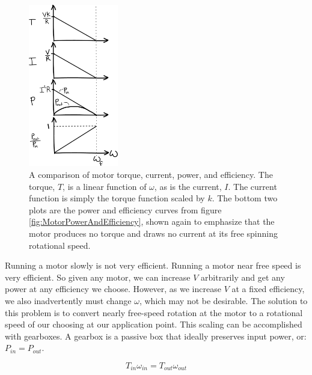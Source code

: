 \begin{figure}[h]		%
\begin{centering}
\includegraphics[width=0.35\textwidth]{Figures/FourMotorCurves}\par
\end{centering}
\caption[Plot: A Comparison of Four Motor Curves vs. $\omega$]{A comparison of motor torque, current, power, and efficiency. The torque, $T$, is a linear function of $\omega$, as is the current, $I$. The current function is simply the torque function scaled by $k$. The bottom two plots are the power and efficiency curves from figure \ref{fig:MotorPowerAndEfficiency}, shown again to emphasize that the motor produces no torque and draws no current at its free spinning rotational speed.}
\label{fig:FourMotorCurves}
\end{figure}
%

Running a motor slowly is not very efficient. Running a motor near free speed is very efficient. So given any motor, we can increase $V$ arbitrarily and get any power at any efficiency we choose. However, as we increase $V$ at a fixed efficiency, we also inadvertently must change $\omega$, which may not be desirable. The solution to this problem is to convert nearly free-speed rotation at the motor to a rotational speed of our choosing at our application point. This scaling can be accomplished with gearboxes. A gearbox is a passive box that ideally preserves input power, or: $P_{in}=P_{out}$.

\begin{equation}
T_{in}\omega_{in} = T_{out}\omega_{out}
\label{eq:GearboxExample}
\end{equation}

